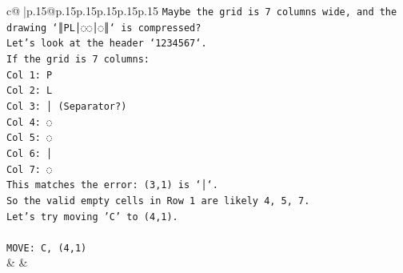 \documentclass{article}
\begin{document}
{\begin{supertabular}{c@{$\;$}|p{.15\linewidth}@{}p{.15\linewidth}p{.15\linewidth}p{.15\linewidth}p{.15\linewidth}p{.15\linewidth}}
{{{\texttt{Maybe the grid is 7 columns wide, and the drawing `║PL│◌◌│◌║` is compressed?} \\
\texttt{Let's look at the header `1234567`.} \\
\texttt{If the grid is 7 columns:} \\
\texttt{Col 1: P} \\
\texttt{Col 2: L} \\
\texttt{Col 3: │ (Separator?)} \\
\texttt{Col 4: ◌} \\
\texttt{Col 5: ◌} \\
\texttt{Col 6: │} \\
\texttt{Col 7: ◌} \\
\texttt{This matches the error: (3,1) is `│`.} \\
\texttt{So the valid empty cells in Row 1 are likely 4, 5, 7.} \\
\texttt{Let's try moving 'C' to (4,1).} \\
\\ 
\texttt{MOVE: C, (4,1)} \\
            }
        }
    }
    & & \\ \\


\end{supertabular}}
\end{document}
